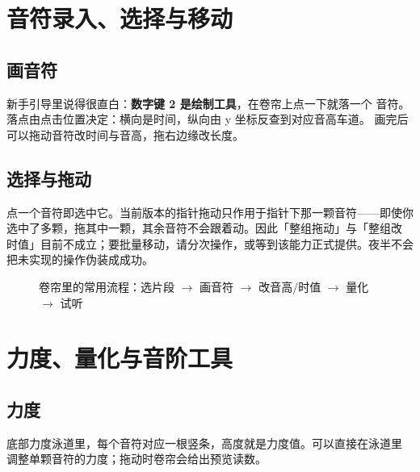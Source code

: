 \section{音符录入、选择与移动}

\subsection{画音符}

新手引导里说得很直白：\textbf{数字键 2 是绘制工具}，在卷帘上点一下就落一个
音符。落点由点击位置决定：横向是时间，纵向由 y 坐标反查到对应音高车道。
画完后可以拖动音符改时间与音高，拖右边缘改长度。

\subsection{选择与拖动}

点一个音符即选中它。当前版本的指针拖动只作用于指针下那一颗音符——即使你
选中了多颗，拖其中一颗，其余音符不会跟着动。因此「整组拖动」与「整组改
时值」目前不成立；要批量移动，请分次操作，或等到该能力正式提供。夜半不会
把未实现的操作伪装成成功。

\begin{figure}[htbp]
\centering
{}
\caption{卷帘里的常用流程：选片段 $\to$ 画音符 $\to$ 改音高/时值 $\to$ 量化 $\to$ 试听}
\label{fig:ch04-roll-flow}
\end{figure}

\section{力度、量化与音阶工具}

\subsection{力度}

底部力度泳道里，每个音符对应一根竖条，高度就是力度值。可以直接在泳道里
调整单颗音符的力度；拖动时卷帘会给出预览读数。

